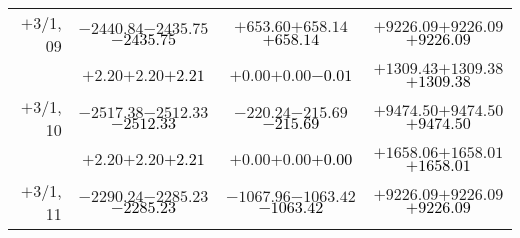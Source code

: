\documentclass[compress]{beamer}
\begin{document}
\begin{frame}
{\begin{tabular}{r | c | c | c}
$+$3/1, 09 & $-2440.84$\hspace{0.1 cm}$-2435.75$\hspace{0.1 cm}\textcolor{black}{$-2435.75$} & $+653.60$\hspace{0.1 cm}$+658.14$\hspace{0.1 cm}\textcolor{black}{$+658.14$} & $+9226.09$\hspace{0.1 cm}$+9226.09$\hspace{0.1 cm}\textcolor{black}{$+9226.09$} \\
           & $+2.20$\hspace{0.1 cm}$+2.20$\hspace{0.1 cm}\textcolor{black}{$+2.21$} & $+0.00$\hspace{0.1 cm}$+0.00$\hspace{0.1 cm}\textcolor{black}{$-0.01$} & $+1309.43$\hspace{0.1 cm}$+1309.38$\hspace{0.1 cm}\textcolor{black}{$+1309.38$} \\
$+$3/1, 10 & $-2517.38$\hspace{0.1 cm}$-2512.33$\hspace{0.1 cm}\textcolor{black}{$-2512.33$} & $-220.24$\hspace{0.1 cm}$-215.69$\hspace{0.1 cm}\textcolor{black}{$-215.69$} & $+9474.50$\hspace{0.1 cm}$+9474.50$\hspace{0.1 cm}\textcolor{black}{$+9474.50$} \\
           & $+2.20$\hspace{0.1 cm}$+2.20$\hspace{0.1 cm}\textcolor{black}{$+2.21$} & $+0.00$\hspace{0.1 cm}$+0.00$\hspace{0.1 cm}\textcolor{black}{$+0.00$} & $+1658.06$\hspace{0.1 cm}$+1658.01$\hspace{0.1 cm}\textcolor{black}{$+1658.01$} \\
$+$3/1, 11 & $-2290.24$\hspace{0.1 cm}$-2285.23$\hspace{0.1 cm}\textcolor{black}{$-2285.23$} & $-1067.96$\hspace{0.1 cm}$-1063.42$\hspace{0.1 cm}\textcolor{black}{$-1063.42$} & $+9226.09$\hspace{0.1 cm}$+9226.09$\hspace{0.1 cm}\textcolor{black}{$+9226.09$} \\

\end{tabular}}
\end{frame}
\end{document}
